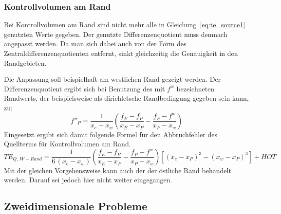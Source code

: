 \subsubsection{Kontrollvolumen am Rand}

Bei Kontrollvolumen am Rand sind nicht mehr alle in Gleichung~\eqref{eq:te_source1}
genutzten Werte gegeben. Der genutzte Differenzenquotient muss demnach angepasst werden.
Da man sich dabei auch von der Form des Zentraldifferenzenquotienten entfernt,
sinkt gleichzeitig die Genauigkeit in den Randgebieten.

Die Anpassung soll beispielhaft am westlichen Rand gezeigt werden. Der Differenzenquotient
ergibt sich bei Benutzung des mit $f^w$ bezeichneten Randwerts, der beispielsweise als
dirichletsche Randbedingung gegeben sein kann, zu:
\begin{equation}
  f''_P = \frac{1}{x_e-x_w}\left(\frac{f_E-f_P}{x_E-x_P}-\frac{f_P-f^w}{x_P-x_w}\right)
\end{equation}
Eingesetzt ergibt sich damit folgende Formel für den Abbruchfehler des Quellterms
für Kontrollvolumen am Rand.
\begin{equation}
  TE_{Q,\ W-Rand} =
\frac{1}{6\,(x_e-x_w)}\left(\frac{f_E-f_P}{x_E-x_P}-\frac{f_P-f^w}{x_P-x_w}\right)
  \left[{{(x_e-x_P)}^3-{(x_w-x_P)}^3}\right] + HOT
\end{equation}
Mit der gleichen Vorgehensweise kann auch der der östliche Rand behandelt werden. Darauf
sei jedoch hier nicht weiter eingegangen.



\subsection{Zweidimensionale Probleme}


